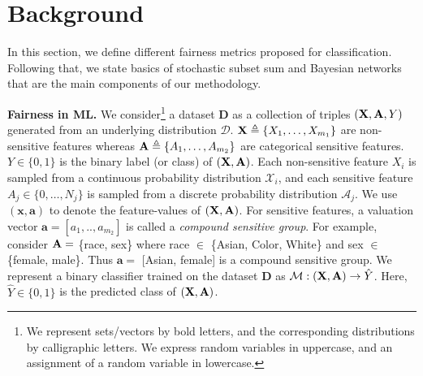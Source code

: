 
	\section{Background}
	In this section, we define different fairness metrics proposed for classification. Following that, we state basics of stochastic subset sum and Bayesian networks that are the main components of our methodology.
	
	\textbf{Fairness in ML.}
	We consider\footnote{{We represent sets/vectors by bold letters, and the corresponding distributions by calligraphic letters. We express random variables in uppercase, and an assignment of a random variable in lowercase.}} a dataset $ \mathbf{D} $ as a collection of triples $ (\mathbf{X}, \mathbf{A}, Y) $ generated from an underlying distribution $\mathcal{D}$. $ \mathbf{X} \triangleq \{X_1, \dots, X_{m_1}\} $ are non-sensitive features whereas $ \mathbf{A} \triangleq \{A_1, \dots, A_{m_2}\} $ are categorical sensitive features.  $Y \in \{0,1\}$ is the binary label (or class) of $(\mathbf{X},\mathbf{A})$. Each non-sensitive feature $ X_i$ is sampled from a continuous probability distribution {$ \mathcal{X}_i $}, and each sensitive feature $ A_j \in \{0, \dots, N_j\}  $ is sampled from a discrete probability distribution {$ \mathcal{A}_j $}. 
 	We use $ (\mathbf{x}, \mathbf{a}) $ to denote the feature-values of  $ (\mathbf{X}, \mathbf{A}) $.  For sensitive features, a valuation vector $ \mathbf{a} = [a_1, .., a_{m_2}] $ is called a \textit{compound sensitive group}. For example, consider $ \mathbf{A} = $ \{race, sex\} where race $ \in $ \{Asian, Color, White\} and sex $ \in $ \{female, male\}. Thus $ \mathbf{a} = $ [Asian, female]  is a compound sensitive group. 
 	We represent a binary classifier trained on the dataset $\mathbf{D}$ as $\mathcal{M}: (\mathbf{X}, \mathbf{A}) \rightarrow \hat{Y} $. Here, $\hat{Y} \in \{0,1\}$ is the predicted class of $ (\mathbf{X}, \mathbf{A}) $.
 	
